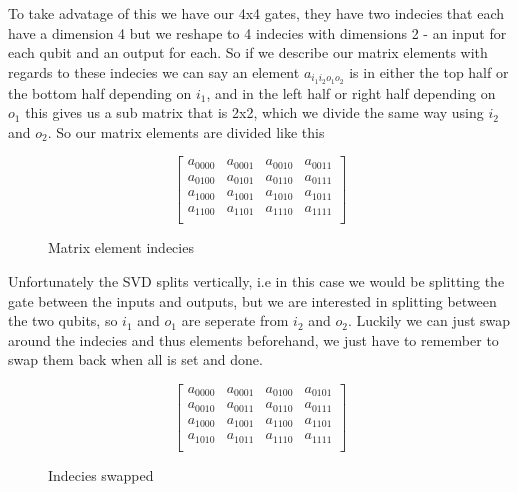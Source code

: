 \vspace{\baselineskip}
\noindent
To take advatage of this we have our 4x4 gates, they have two indecies that each have a dimension 4 but we reshape to 4 indecies with dimensions 2 - an input for each qubit and an output for each. So if we describe our matrix elements with regards to these indecies we can say an element $a_{i_1i_2o_1o_2}$ is in either the top half or the bottom half depending on $i_1$, and in the left half or right half depending on $o_1$ this gives us a sub matrix that is 2x2, which we divide the same way using $i_2$ and $o_2$. So our matrix elements are divided like this 
\begin{figure}[H]
    $$
    \begin{bmatrix}
        a_{0000} & a_{0001} & a_{0010} & a_{0011}\\
        a_{0100} & a_{0101} & a_{0110} & a_{0111}\\
        a_{1000} & a_{1001} & a_{1010} & a_{1011}\\
        a_{1100} & a_{1101} & a_{1110} & a_{1111}\\
    \end{bmatrix}
    $$
    \caption{Matrix element indecies}
    \label{fig:matrix_indecies}
\end{figure}
\noindent
Unfortunately the SVD splits vertically, i.e in this case we would be splitting the gate between the inputs and outputs, but we are interested in splitting between the two qubits, so $i_1$ and $o_1$ are seperate from $i_2$ and $o_2$. Luckily we can just swap around the indecies and thus elements beforehand, we just have to remember to swap them back when all is set and done. 
\begin{figure}[H]
    $$
    \begin{bmatrix}
        a_{0000} & a_{0001} & a_{0100} & a_{0101}\\
        a_{0010} & a_{0011} & a_{0110} & a_{0111}\\
        a_{1000} & a_{1001} & a_{1100} & a_{1101}\\
        a_{1010} & a_{1011} & a_{1110} & a_{1111}\\
    \end{bmatrix}
    $$
    \caption{Indecies swapped}
    \label{fig:matrix_swapped}
\end{figure}

